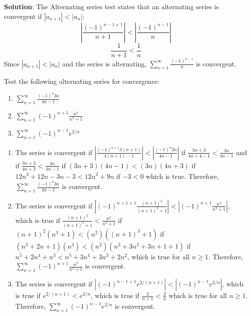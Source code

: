 \textbf{Solution}: The Alternating series test states that an alternating 
series is convergent if $|a_{n+1}| < |a_n|$:
$$\left| \frac{(-1)^{n-1+1}}{n+1} \right| < \left| \frac{(-1)^{n-1}}{n} \right|$$
$$\frac{1}{n+1} < \frac{1}{n}$$
Since $|a_{n+1}| < |a_n|$ and the series is alternating, $\sum_{n=1}^\infty 
\frac{(-1)^{n-1}}{n}$ is convergent. 

\begin{Exercise}[label=alt1]
Test the following alternating series for convergence:
\begin{enumerate}
\item $\sum_{n=1}^\infty \frac{(-1)^n 3n}{4n-1}$
\item $\sum_{n=1}^\infty (-1)^{n+1} \frac{n^2}{n^3 + 1}$
\item $\sum_{n=1}^\infty (-1)^{n-1} e^{2/n}$
\end{enumerate}
\vspace{50mm}
\end{Exercise}

\begin{Answer}[ref = alt1]
\begin{enumerate}
\item The series is convergent if $\left| \frac{(-1)^{n+1} 3(n+1)}{4(n+1)-1} 
\right| < \left| \frac{(-1)^n 3n}{4n-1} \right|$ if $\frac{3n+3}{4n+4-1} < 
\frac{3n}{4n-1}$ and if $\frac{3n+3}{4n+3} < \frac{3n}{4n-1}$ if $(3n+3)(4n-1) 
< (3n)(4n+3)$ if $12n^2 + 12n - 3n - 3 < 12n^2 + 9n$ if $-3 < 0$ which is true. 
Therefore, $\sum_{n=1}^\infty \frac{(-1)^n 3n}{4n-1}$ is convergent. 
\item The series is convergent if $\left| (-1)^{n+1+1} \frac{(n+1)^2}{(n+1)^3 
+ 1} \right| < \left| (-1)^{n+1} \frac{n^2}{n^3 + 1} \right|$, which is true if 
$\frac{(n+1)^2}{(n+1)^3 + 1} < \frac{n^2}{n^3 + 1}$ if $(n+1)^2 (n^3 + 1) < 
(n^2) ((n+1)^3+1)$ if $(n^2 + 2n + 1)(n^3) < (n^2) (n^3 + 3n^2 + 3n + 1 + 1)$ 
if $n^5 + 2n^4 + n^3 < n^5 + 3n^4 + 3n^3 + 2n^2$, which is true for all $n \geq 
1$. Therefore, $\sum_{n=1}^\infty (-1)^{n+1} \frac{n^2}{n^3 + 1}$ is convergent.
\item The series is convergent if $\left| (-1)^{n-1+1} e^{2/(n+1)} \right| < 
\left| (-1)^{n - 1} e^{2/n} \right|$, which is true if $e^{2/(n+1)} < e^{2/n}$, 
which is true if $\frac{2}{n+1} < \frac{2}{n}$ which is true for all $n \geq 1$. 
Therefore, $\sum_{n=1}^\infty (-1)^{n-1} e^{2/n}$ is convergent. 
\end{enumerate}
\end{Answer}






